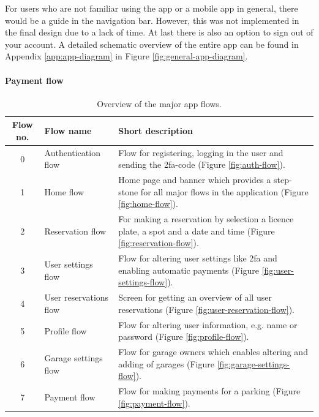 \ind For users who are not familiar using the app or a mobile app in general, there would be a guide in the navigation bar. However, this was not implemented in the final design due to a lack of time. At last there is also an option to sign out of your account. A detailed schematic overview of the entire app can be found in Appendix \ref{app:app-diagram} in Figure \ref{fig:general-app-diagram}. 

\paragraph{Payment flow}

\begin{table}[htp]
    \centering
    \begin{tabular}{|c|p{3cm}|p{10cm}|}
    \hline
         \textbf{Flow no.} & \textbf{Flow name} & \textbf{Short description} \\
         \hline
         \hline
         0 & Authentication flow & Flow for registering, logging in the user and sending the \ac{2fa}-code (Figure \ref{fig:auth-flow}). \\
         \hline
         1 & Home flow & Home page and banner which provides a step-stone for all major flows in the application (Figure \ref{fig:home-flow}).\\
         \hline 
         2 & Reservation flow & For making a reservation by selection a licence plate, a spot and a date and time (Figure \ref{fig:reservation-flow}). \\
         \hline 
         3 & User settings flow & Flow for altering user settings like \ac{2fa} and enabling automatic payments (Figure \ref{fig:user-settings-flow}). \\
         \hline
         4 & User reservations flow & Screen for getting an overview of all user reservations (Figure \ref{fig:user-reservation-flow}). \\ 
         \hline
         5 & Profile flow & Flow for altering user information, e.g. name or password (Figure \ref{fig:profile-flow}). \\
         \hline 
         6 & Garage settings flow & Flow for garage owners which enables altering and adding of garages (Figure \ref{fig:garage-settings-flow}). \\ 
         \hline
         7 & Payment flow & Flow for making payments for a parking (Figure \ref{fig:payment-flow}). \\
         \hline
    \end{tabular}
    \caption{Overview of the major app flows.}
    \label{tab:app-flows}
\end{table}

